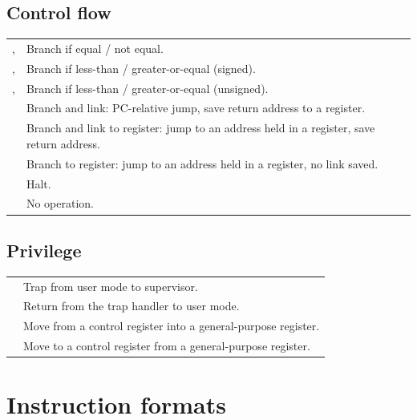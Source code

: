 \documentclass[11pt]{article}
\begin{document}
\subsection{Control flow}
\begin{center}
\begin{tabular}{@{}L{3.0cm} L{10.4cm}@{}}
\toprule
{},    & Branch if equal / not equal. \\
,    & Branch if less-than / greater-or-equal (signed). \\
,  & Branch if less-than / greater-or-equal (unsigned). \\
               & Branch and link: PC-relative jump, save return address to a register. \\
              & Branch and link to register: jump to an address held in a register, save return address. \\
                & Branch to register: jump to an address held in a register, no link saved. \\
               & Halt. \\
               & No operation. \\
\bottomrule
\end{tabular}
\end{center}

\subsection{Privilege}
\begin{center}
\begin{tabular}{@{}L{3.0cm} L{10.4cm}@{}}
\toprule
{}            & Trap from user mode to supervisor. \\
             & Return from the trap handler to user mode. \\
    & Move from a control register into a general-purpose register. \\
    & Move to a control register from a general-purpose register. \\
\bottomrule
\end{tabular}
\end{center}

\section{Instruction formats}
\end{document}
